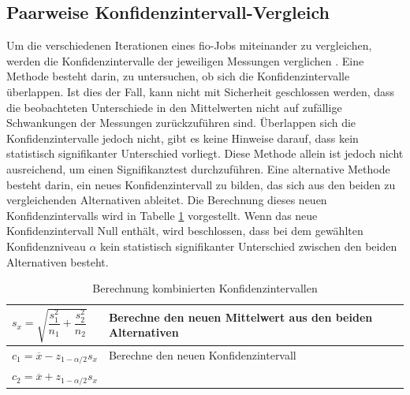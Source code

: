 \subsection{Paarweise Konfidenzintervall-Vergleich}

Um die verschiedenen Iterationen eines fio-Jobs miteinander zu vergleichen, werden die Konfidenzintervalle der jeweiligen Messungen verglichen \cite{statistically_rigorous}. 
Eine Methode besteht darin, zu untersuchen, ob sich die Konfidenzintervalle überlappen. 
Ist dies der Fall, kann nicht mit Sicherheit geschlossen werden, dass die beobachteten Unterschiede in den Mittelwerten nicht auf zufällige Schwankungen der Messungen zurückzuführen sind.
Überlappen sich die Konfidenzintervalle jedoch nicht, gibt es keine Hinweise darauf, 
dass kein statistisch signifikanter Unterschied vorliegt. 
Diese Methode allein ist jedoch nicht ausreichend, um einen Signifikanztest durchzuführen. 
Eine alternative Methode besteht darin, ein neues Konfidenzintervall zu bilden, das sich aus den beiden zu vergleichenden Alternativen ableitet.
Die Berechnung dieses neuen Konfidenzintervalls wird in Tabelle \ref{tab:two_Iteration_Konfidenzintervall} vorgestellt.
Wenn das neue Konfidenzintervall Null enthält, wird beschlossen, 
dass bei dem gewählten Konfidenzniveau $\alpha$ kein statistisch signifikanter Unterschied zwischen den beiden Alternativen besteht.

\begin{center}
  \begin{table}[h!]
    \begin{tabularx}{\textwidth}{|X|X|}
      \hline
       $s_x =  \sqrt{\dfrac{s^2_1}{n_1} + \dfrac{s^2_2}{n_2}}$ & Berechne den neuen Mittelwert aus den beiden Alternativen  \\ 
      \hline
      $c_1 = \overline{x} - z_{1-\alpha/2} s_x$ & Berechne den neuen Konfidenzintervall \\
      $c_2 = \overline{x} + z_{1-\alpha/2} s_x$ & \\
      \hline
    \end{tabularx}
    \caption{Berechnung kombinierten Konfidenzintervallen}
    \label{tab:two_Iteration_Konfidenzintervall}
  \end{table}
\end{center}



